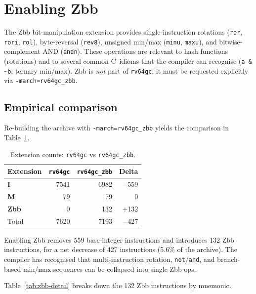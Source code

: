 \documentclass[11pt,a4paper]{article}
\begin{document}
\section{Enabling Zbb}
\label{sec:zbb}

The Zbb bit-manipulation extension provides single-instruction
rotations (\texttt{ror}, \texttt{rori}, \texttt{rol}), byte-reversal
(\texttt{rev8}), unsigned min/max (\texttt{minu}, \texttt{maxu}), and
bitwise-complement AND (\texttt{andn}).  These operations are relevant
to hash functions (rotations) and to several common C~idioms that the
compiler can recognise (\texttt{a \& \textasciitilde b}; ternary
min/max).  Zbb is \emph{not} part of \texttt{rv64gc}; it must be
requested explicitly via \texttt{-march=rv64gc\_zbb}.

\subsection{Empirical comparison}

Re-building the archive with \texttt{-march=rv64gc\_zbb} yields the
comparison in Table~\ref{tab:zbb-summary}.

\begin{table}[ht]
\centering
\caption{Extension counts: \texttt{rv64gc} vs \texttt{rv64gc\_zbb}.}
\label{tab:zbb-summary}
\begin{tabular}{@{}lrrr@{}}
\toprule
Extension & \texttt{rv64gc} & \texttt{rv64gc\_zbb} & Delta \\
\midrule
\textbf{I}   & 7541 & 6982 & $-$559 \\
\textbf{M}   &   79 &   79 &      0 \\
\textbf{Zbb} &    0 &  132 &  +132 \\
\midrule
Total        & 7620 & 7193 &   $-$427 \\
\bottomrule
\end{tabular}
\end{table}

Enabling Zbb removes 559 base-integer instructions and introduces 132
Zbb instructions, for a net decrease of 427 instructions (5.6\% of the
archive).  The compiler has recognised that multi-instruction
rotation, \texttt{not}/\texttt{and}, and branch-based min/max
sequences can be collapsed into single Zbb ops.

Table~\ref{tab:zbb-detail} breaks down the 132 Zbb instructions by
mnemonic.
\end{document}
